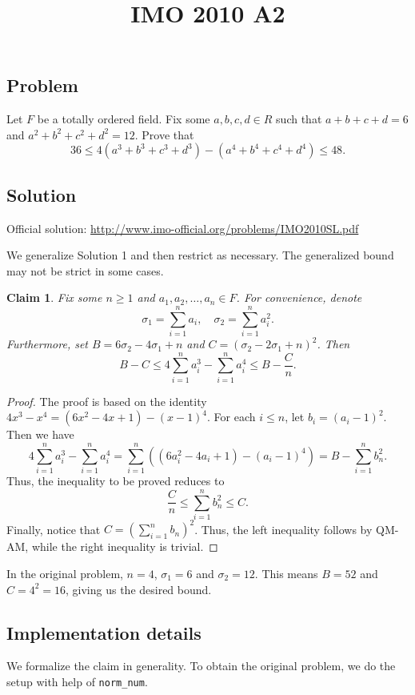 \documentclass{article}
\title{IMO 2010 A2}
\author{}
\date{}
\newtheorem*{claim}{Claim}
\begin{document}
\maketitle



\subsection*{Problem}

Let $F$ be a totally ordered field.
Fix some $a, b, c, d \in R$ such that $a + b + c + d = 6$ and $a^2 + b^2 + c^2 + d^2 = 12$.
Prove that
\[ 36 \leq 4(a^3 + b^3 + c^3 + d^3) - (a^4 + b^4 + c^4 + d^4) \leq 48. \]



\subsection*{Solution}

Official solution: \url{http://www.imo-official.org/problems/IMO2010SL.pdf}

We generalize Solution 1 and then restrict as necessary.
The generalized bound may not be strict in some cases.

\begin{claim}
Fix some $n \geq 1$ and $a_1, a_2, \ldots, a_n \in F$.
For convenience, denote
\[ \sigma_1 = \displaystyle \sum_{i = 1}^n a_i, \quad \sigma_2 = \displaystyle \sum_{i = 1}^n a_i^2. \]
Furthermore, set $B = 6 \sigma_2 - 4 \sigma_1 + n$ and $C = (\sigma_2 - 2 \sigma_1 + n)^2$.
Then
\[ B - C \leq 4 \sum_{i = 1}^n a_i^3 - \sum_{i = 1}^n a_i^4 \leq B - \frac{C}{n}. \]
\end{claim}
\begin{proof}
The proof is based on the identity $4x^3 - x^4 = (6x^2 - 4x + 1) - (x - 1)^4$.
For each $i \leq n$, let $b_i = (a_i - 1)^2$.
Then we have
\[ 4 \sum_{i = 1}^n a_i^3 - \sum_{i = 1}^n a_i^4 = \sum_{i = 1}^n ((6 a_i^2 - 4 a_i + 1) - (a_i - 1)^4) = B - \sum_{i = 1}^n b_n^2. \]
Thus, the inequality to be proved reduces to
\[ \frac{C}{n} \leq \sum_{i = 1}^n b_n^2 \leq C. \]
Finally, notice that $C = \displaystyle \left(\sum_{i = 1}^n b_n\right)^2$.
Thus, the left inequality follows by QM-AM, while the right inequality is trivial.
\end{proof}

In the original problem, $n = 4$, $\sigma_1 = 6$ and $\sigma_2 = 12$.
This means $B = 52$ and $C = 4^2 = 16$, giving us the desired bound.



\subsection*{Implementation details}

We formalize the claim in generality.
To obtain the original problem, we do the setup with help of \texttt{norm\_num}.
\end{document}
